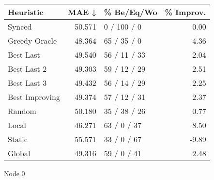 \begin{tabular}{lrlr}
\toprule
\textbf{Heuristic} & \textbf{MAE ↓} & \textbf{\% Be/Eq/Wo} & \textbf{\% Improv.} \\
\midrule
            Synced &         50.571 &          0 / 100 / 0 &                0.00 \\
     Greedy Oracle &         48.364 &          65 / 35 / 0 &                4.36 \\
         Best Last &         49.540 &         56 / 11 / 33 &                2.04 \\
       Best Last 2 &         49.303 &         59 / 12 / 29 &                2.51 \\
       Best Last 3 &         49.432 &         56 / 14 / 29 &                2.25 \\
    Best Improving &         49.374 &         57 / 12 / 31 &                2.37 \\
            Random &         50.180 &         35 / 38 / 26 &                0.77 \\
             Local &         46.271 &          63 / 0 / 37 &                8.50 \\
            Static &         55.571 &          33 / 0 / 67 &               -9.89 \\
            Global &         49.316 &          59 / 0 / 41 &                2.48 \\
\bottomrule
\end{tabular}
\caption{Node 0}
\label{tab:non_lr05_le2_bs2_0}
